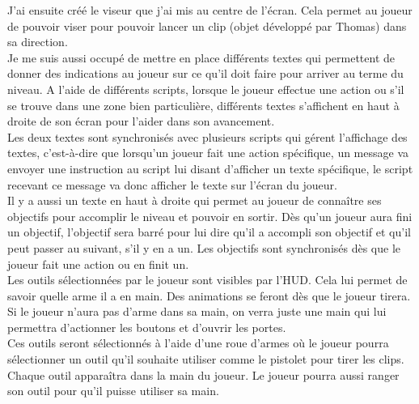 \documentclass[a4paper , 12pt]{article}
\begin{document}
J'ai ensuite créé le viseur que j'ai mis au centre de l'écran. Cela permet au joueur de pouvoir viser pour pouvoir lancer un clip (objet développé par Thomas) dans sa direction.\\


Je me suis aussi occupé de mettre en place différents textes qui permettent de donner des indications au joueur sur ce qu'il doit faire pour arriver au terme du niveau. A l'aide de différents scripts, lorsque le joueur effectue une action ou s'il se trouve dans une zone bien particulière, différents textes s'affichent en haut à droite de son écran pour l'aider dans son avancement.\\

Les deux textes sont synchronisés avec plusieurs scripts qui gérent l'affichage des textes, c'est-à-dire que lorsqu'un joueur fait une action spécifique, un message va envoyer une instruction au script lui disant d'afficher un texte spécifique, le script recevant ce message va donc afficher le texte sur l'écran du joueur.\\


Il y a aussi un texte en haut à droite qui permet au joueur de connaître ses objectifs pour accomplir le niveau et pouvoir en sortir. Dès qu'un joueur aura fini un objectif, l'objectif sera barré pour lui dire qu'il a accompli son objectif et qu'il peut passer au suivant, s'il y en a un. Les objectifs sont synchronisés dès que le joueur fait une action ou en finit un.\\


Les outils sélectionnées par le joueur sont visibles par l’HUD. Cela lui permet de savoir quelle arme il a en main. Des animations se feront dès que le joueur tirera. Si le joueur n’aura pas d’arme dans sa main, on verra juste une main qui lui permettra d’actionner les boutons et d’ouvrir les portes.\\


Ces outils seront sélectionnés à l’aide d’une roue d'armes où le joueur pourra sélectionner un outil qu’il souhaite utiliser comme le pistolet pour tirer les clips. Chaque outil apparaîtra dans la main du joueur. Le joueur pourra aussi ranger son outil pour qu’il puisse utiliser sa main. 

\quad

\quad

\quad
\end{document}
